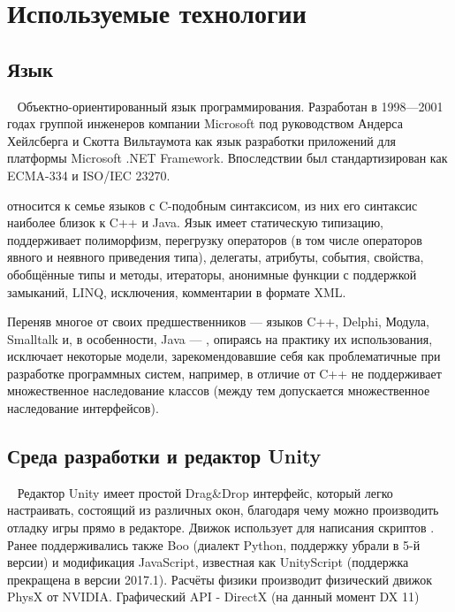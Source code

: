 \section{Используемые технологии}
\label{sub:domain:sec_tech}

\subsection{Язык \csharp}~
Объектно-ориентированный язык программирования. Разработан в 1998—2001 годах группой инженеров компании Microsoft под руководством Андерса Хейлсберга и Скотта Вильтаумота как язык разработки приложений для платформы Microsoft .NET Framework. Впоследствии был стандартизирован как ECMA-334 и ISO/IEC 23270.

\csharp относится к семье языков с C-подобным синтаксисом, из них его синтаксис наиболее близок к C++ и Java. Язык имеет статическую типизацию, поддерживает полиморфизм, перегрузку операторов (в том числе операторов явного и неявного приведения типа), делегаты, атрибуты, события, свойства, обобщённые типы и методы, итераторы, анонимные функции с поддержкой замыканий, LINQ, исключения, комментарии в формате XML.

Переняв многое от своих предшественников — языков C++, Delphi, Модула, Smalltalk и, в особенности, Java — \csharp, опираясь на практику их использования, исключает некоторые модели, зарекомендовавшие себя как проблематичные при разработке программных систем, например, \csharp в отличие от C++ не поддерживает множественное наследование классов (между тем допускается множественное наследование интерфейсов).

\subsection{Среда разработки и редактор Unity}~
Редактор Unity имеет простой Drag\&Drop интерфейс, который легко настраивать, состоящий из различных окон, благодаря чему можно производить отладку игры прямо в редакторе. Движок использует для написания скриптов \csharp. Ранее поддерживались также Boo (диалект Python, поддержку убрали в 5-й версии) и модификация JavaScript, известная как UnityScript (поддержка прекращена в версии 2017.1). Расчёты физики производит физический движок PhysX от NVIDIA. Графический API - DirectX (на данный момент DX 11)

